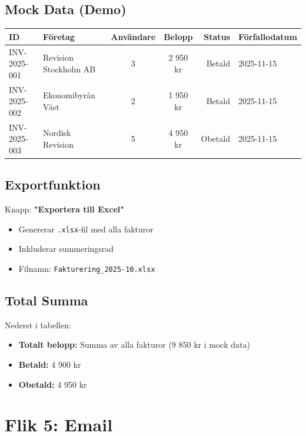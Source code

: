 \documentclass[12pt,a4paper]{article}
\begin{document}
\subsection{Mock Data (Demo)}
\begin{table}[h]
\centering
\small
\begin{tabular}{|l|l|c|c|r|l|}
\hline
\textbf{ID} & \textbf{Företag} & \textbf{Användare} & \textbf{Belopp} & \textbf{Status} & \textbf{Förfallodatum} \\
\hline
INV-2025-001 & Revision Stockholm AB & 3 & 2 950 kr & Betald & 2025-11-15 \\
INV-2025-002 & Ekonomibyrån Väst & 2 & 1 950 kr & Betald & 2025-11-15 \\
INV-2025-003 & Nordisk Revision & 5 & 4 950 kr & Obetald & 2025-11-15 \\
\hline
\end{tabular}
\end{table}

\subsection{Exportfunktion}
Knapp: \textbf{"Exportera till Excel"}
\begin{itemize}
  \item Genererar \texttt{.xlsx}-fil med alla fakturor
  \item Inkluderar summeringsrad
  \item Filnamn: \texttt{Fakturering\_2025-10.xlsx}
\end{itemize}

\subsection{Total Summa}
Nederst i tabellen:
\begin{itemize}
  \item \textbf{Totalt belopp:} Summa av alla fakturor (9 850 kr i mock data)
  \item \textbf{Betald:} 4 900 kr
  \item \textbf{Obetald:} 4 950 kr
\end{itemize}

\section{Flik 5: Email}
\end{document}
